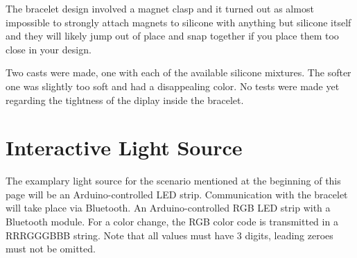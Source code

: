 The bracelet design involved a magnet clasp and it turned out as almost impossible to strongly attach magnets to silicone with anything but silicone itself and they will likely jump out of place and snap together if you place them too close in your design.

Two casts were made, one with each of the available silicone mixtures. The softer one was slightly too soft and had a disappealing color. No tests were made yet regarding the tightness of the diplay inside the bracelet.

\section{Interactive Light Source}

The examplary light source for the scenario mentioned at the beginning of this page will be an Arduino-controlled LED strip. Communication with the bracelet will take place via Bluetooth. An Arduino-controlled RGB LED strip with a Bluetooth module. For a color change, the RGB color code is transmitted in a RRRGGGBBB string. Note that all values must have 3 digits, leading zeroes must not be omitted. 